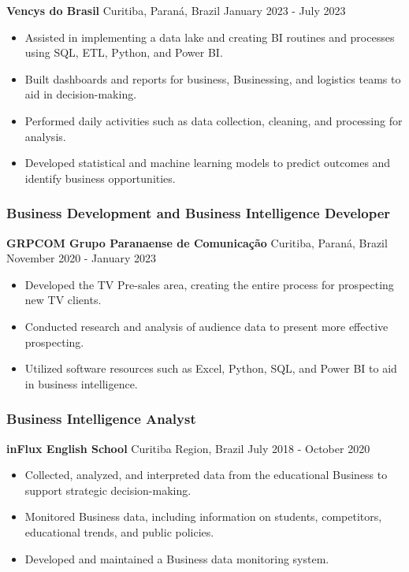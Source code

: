 \documentclass[
]{article}
\providecommand{\tightlist}{%
  \setlength{\itemsep}{0pt}\setlength{\parskip}{0pt}}
\begin{document}
\textbf{Vencys do Brasil} \textbar{} Curitiba, Paraná, Brazil \textbar{}
January 2023 - July 2023

\begin{itemize}
\tightlist
\item
  Assisted in implementing a data lake and creating BI routines and
  processes using SQL, ETL, Python, and Power BI.
\item
  Built dashboards and reports for business, Businessing, and logistics
  teams to aid in decision-making.
\item
  Performed daily activities such as data collection, cleaning, and
  processing for analysis.
\item
  Developed statistical and machine learning models to predict outcomes
  and identify business opportunities.
\end{itemize}

\subsubsection{Business Development and Business Intelligence
Developer}\label{business-development-and-business-intelligence-developer}

\textbf{GRPCOM \textbar{} Grupo Paranaense de Comunicação} \textbar{}
Curitiba, Paraná, Brazil \textbar{} November 2020 - January 2023

\begin{itemize}
\tightlist
\item
  Developed the TV Pre-sales area, creating the entire process for
  prospecting new TV clients.
\item
  Conducted research and analysis of audience data to present more
  effective prospecting.
\item
  Utilized software resources such as Excel, Python, SQL, and Power BI
  to aid in business intelligence.
\end{itemize}

\subsubsection{Business Intelligence
Analyst}\label{business-intelligence-analyst}

\textbf{inFlux English School} \textbar{} Curitiba Region, Brazil
\textbar{} July 2018 - October 2020

\begin{itemize}
\tightlist
\item
  Collected, analyzed, and interpreted data from the educational
  Business to support strategic decision-making.
\item
  Monitored Business data, including information on students,
  competitors, educational trends, and public policies.
\item
  Developed and maintained a Business data monitoring system.
\end{itemize}
\end{document}
